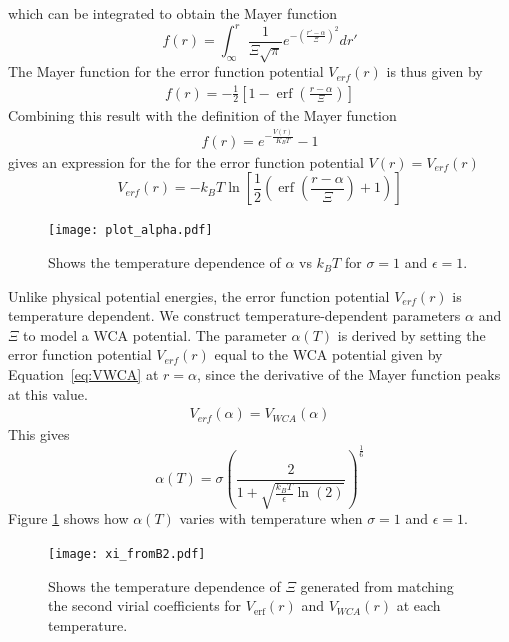 \documentclass[double,12pt]{beavtex}
\begin{document}
which can be integrated to obtain the Mayer function
\begin{equation}{f(r)=\int_{\infty}^r{ \frac{1}{\Xi\sqrt{\pi}}e^{-\left(\frac{r'-\alpha}{\Xi}\right)^2}{dr'}}}\end{equation} 
The Mayer function for the error function potential $V_{erf}(r)$ is thus 
given by
\begin{align}  \label{eq:VerfMayerfunction}
     f(r)=-\frac{1}{2}\left[1-\operatorname{erf}\left(\frac{r-\alpha}{\Xi}\right)\right]
\end{align} 
Combining this result with the definition of the Mayer function 
\begin{align}f(r)=e^{-\frac{V(r)}{K_BT}}-1\end{align} 
gives an expression for the for the error function potential  $V(r)=V_{erf}(r)$ 
\begin{equation} \label{eq:Verf}
	V_{erf}(r)=-k_BT\ln\left[\frac{1}{2}\left(\operatorname{erf}\left(\frac{r-\alpha}{\Xi}\right)+1\right)\right]
\end{equation}  
\begin{figure}
  \centering
  \texttt{[image: plot\_alpha.pdf]}
  \caption{Shows the temperature dependence of $\alpha$ vs $k_BT$ 
  for $\sigma=1$ and $\epsilon=1$.}
  \label{fig:alphaXivsT}
\end{figure}
Unlike physical potential energies, the error function potential $V_{erf}(r)$ is temperature dependent.
We construct temperature-dependent parameters $\alpha$ and $\Xi$ 
to model a WCA potential. 
The parameter $\alpha(T)$ is derived by setting the error function potential $V_{erf}(r)$ 
equal to the WCA potential given by Equation~\ref{eq:VWCA} at $r=\alpha$, since 
the derivative of the Mayer function peaks at this value. 
\begin{align}
    V_{erf}(\alpha)=V_{WCA}(\alpha)
\end{align}
This gives
\begin{equation}\label{alphaT}\alpha(T)=\sigma\left(\frac{2}{1+\sqrt{\frac{k_BT}{\epsilon}\ln(2)}}\right)^\frac{1}{6}\end{equation} 
Figure \ref{fig:alphaXivsT} shows how $\alpha(T)$ varies with temperature 
when $\sigma=1$ and $\epsilon=1$.    

\begin{figure}
  \centering
  \texttt{[image: xi\_fromB2.pdf]}
  \caption{Shows the temperature dependence of $\Xi$ generated from 
  matching the second virial coefficients for $V_{\operatorname{erf}}(r)$ and $V_{WCA}(r)$ 
  at each temperature.}
  \label{fig:xi_fromB2vsT}
\end{figure}
\end{document}
